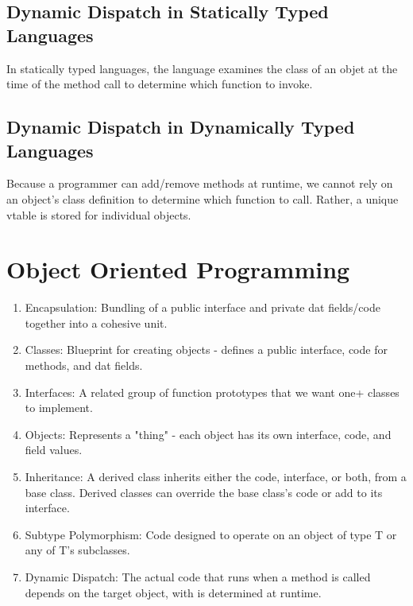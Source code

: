 \documentclass{article}
\begin{document}
\subsection{Dynamic Dispatch in Statically Typed Languages}
In statically typed languages, the language examines the class of an
objet at the time of the method call to determine which function to
invoke.

\subsection{Dynamic Dispatch in Dynamically Typed Languages}
Because a programmer can add/remove methods at runtime, we cannot rely
on an object's class definition to determine which function to
call. Rather, a unique vtable is stored for individual objects.


\section{Object Oriented Programming}
\begin{enumerate}[label=(\roman*)]
\item Encapsulation: Bundling of a public interface and private dat
  fields/code together into a cohesive unit.
\item Classes: Blueprint for creating objects - defines a public
  interface, code for methods, and dat fields.
\item Interfaces: A related group of function prototypes that we want
  one+ classes to implement.
\item Objects: Represents a "thing" - each object has its own
  interface, code, and field values.
\item Inheritance: A derived class inherits either the code,
  interface, or both, from a base class. Derived classes can override
  the base class's code or add to its interface.
\item Subtype Polymorphism: Code designed to operate on an object of
  type T or any of T's subclasses.
\item Dynamic Dispatch: The actual code that runs when a method is
  called depends on the target object, with is determined at runtime.
\end{enumerate}
\end{document}

